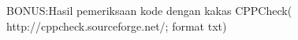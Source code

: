 B\+O\+N\+US\+:​\+Hasil pemeriksaan kode dengan kakas C\+P\+P\+Check(​http\+://cppcheck.sourceforge.\+net/​; format txt) 